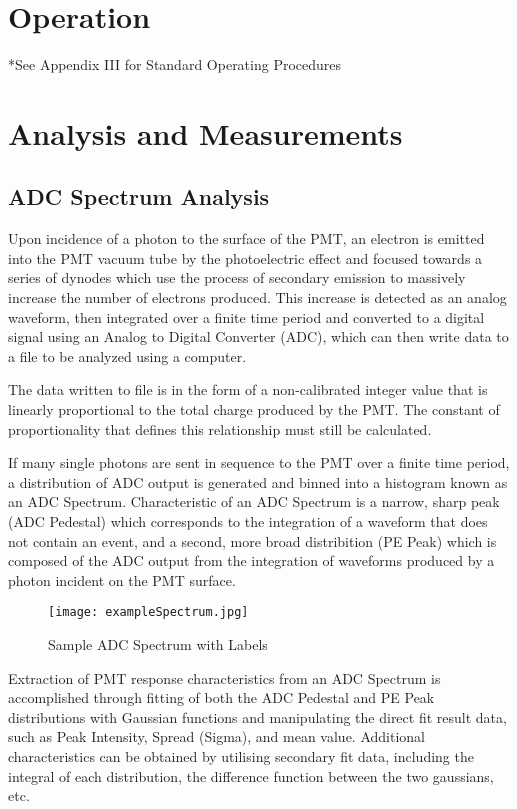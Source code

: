 \documentclass[journal]{IEEEtran}
\begin{document}
\section{Operation}

*See Appendix III for Standard Operating Procedures

\section{Analysis and Measurements}\label{sec:general_analysis}

\subsection{ADC Spectrum Analysis}\label{sec:adc-spectrum-analysis}
Upon incidence of a photon to the surface of the PMT, an electron is emitted into the PMT vacuum tube by the photoelectric effect and focused towards a series of dynodes which use the process of secondary emission to massively increase the number of electrons produced.  This increase is detected as an analog waveform, then integrated over a finite time period and converted to a digital signal using an Analog to Digital Converter (ADC), which can then write data to a file to be analyzed using a computer.  

The data written to file is in the form of a non-calibrated integer value that is linearly proportional to the total charge produced by the PMT. The constant of proportionality that defines this relationship must still be calculated. 

If many single photons are sent in sequence to the PMT over a finite time period, a distribution of ADC output is generated and binned into a histogram known as an ADC Spectrum. Characteristic of an ADC Spectrum is a narrow, sharp peak (ADC Pedestal) which corresponds to the integration of a waveform that does not contain an event, and a second, more broad distribition (PE Peak) which is composed of the ADC output from the integration of waveforms produced by a photon incident on the PMT surface. 
\FloatBarrier

\begin{figure}[!htpb]
	\centering	
	\texttt{[image: exampleSpectrum.jpg]}
	\caption{Sample ADC Spectrum with Labels}
	
\end{figure}

\FloatBarrier

Extraction of PMT response characteristics from an ADC Spectrum is accomplished through fitting of both the ADC Pedestal and PE Peak distributions with Gaussian functions and manipulating the direct fit result data, such as Peak Intensity, Spread (Sigma), and mean value.  Additional characteristics can be obtained by utilising secondary fit data, including the integral of each distribution, the difference function between the two gaussians, etc.
\end{document}
